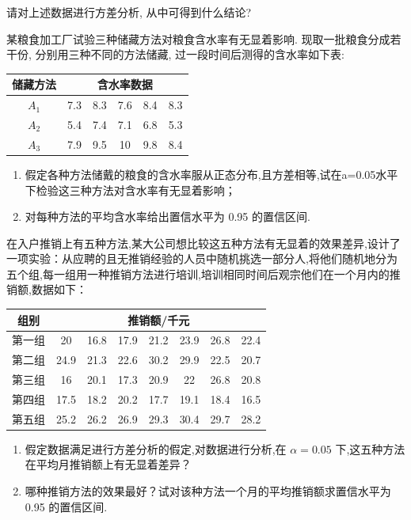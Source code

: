 \begin{xiti}
  请对上述数据进行方差分析, 从中可得到什么结论?
  \item 某粮食加工厂试验三种储藏方法对粮食含水率有无显着影响. 现取一批粮食分成若干份, 分别用三种不同的方法储藏, 过一段时间后测得的含水率如下表:
  \begin{center}
    \begin{tabular}{cccccc}
      \toprule
      储藏方法  & \multicolumn{5}{c}{含水率数据} \\
      \midrule
      $A_1$    & 7.3   & 8.3   & 7.6   & 8.4   & 8.3 \\
      $A_2$    & 5.4   & 7.4   & 7.1   & 6.8   & 5.3 \\
      $A_3$    & 7.9   & 9.5   & 10    & 9.8   & 8.4 \\
      \bottomrule
    \end{tabular}%
  \end{center}
  \begin{enumerate}
    \item 假定各种方法储戴的粮食的含水率服从正态分布,且方差相等,试在a=0.05水平下检验这三种方法对含水率有无显着影响；
    \item 对每种方法的平均含水率给出置信水平为 0.95 的置信区间.
  \end{enumerate}
  \item 在入户推销上有五种方法,某大公司想比较这五种方法有无显着的效果差异,设计了一项实验：从应聘的且无推销经验的人员中随机挑选一部分人,将他们随机地分为五个组,每一组用一种推销方法进行培训,培训相同时间后观宗他们在一个月内的推销额,数据如下：
  \begin{center}
    \begin{tabular}{cccccccc}
      \toprule
      组别    & \multicolumn{7}{c}{推销额/千元} \\
      \midrule
      第一组   & 20    & 16.8  & 17.9  & 21.2  & 23.9  & 26.8  & 22.4 \\
      第二组   & 24.9  & 21.3  & 22.6  & 30.2  & 29.9  & 22.5  & 20.7 \\
      第三组   & 16    & 20.1  & 17.3  & 20.9  & 22    & 26.8  & 20.8 \\
      第四组   & 17.5  & 18.2  & 20.2  & 17.7  & 19.1  & 18.4  & 16.5 \\
      第五组   & 25.2  & 26.2  & 26.9  & 29.3  & 30.4  & 29.7  & 28.2 \\
      \bottomrule
    \end{tabular}%
  \end{center}
  \begin{enumerate}
    \item 假定数据满足进行方差分析的假定,对数据进行分析,在 $\alpha = 0.05$ 下,这五种方法在平均月推销额上有无显着差异？
    \item 哪种推销方法的效果最好？试对该种方法一个月的平均推销额求置信水平为 0.95 的置信区间.
  \end{enumerate}
\end{xiti}

